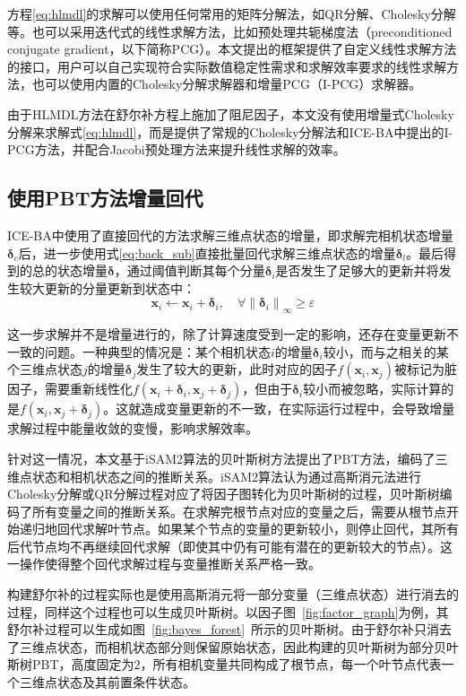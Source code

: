 方程\eqref{eq:hlmdl}的求解可以使用任何常用的矩阵分解法，如QR分解、Cholesky分解等。也可以采用迭代式的线性求解方法，比如预处理共轭梯度法（preconditioned conjugate gradient，以下简称PCG）。本文提出的框架提供了自定义线性求解方法的接口，用户可以自己实现符合实际数值稳定性需求和求解效率要求的线性求解方法，也可以使用内置的Cholesky分解求解器和增量PCG（I-PCG）求解器。

由于HLMDL方法在舒尔补方程上施加了阻尼因子，本文没有使用增量式Cholesky分解\citep{polok2013incremental}来求解式\eqref{eq:hlmdl}，而是提供了常规的Cholesky分解法和ICE-BA中提出的I-PCG方法，并配合Jacobi预处理方法\citep{jeong2012pushing}来提升线性求解的效率。

\subsection{使用PBT方法增量回代}

ICE-BA中使用了直接回代的方法求解三维点状态的增量，即求解完相机状态增量$\bm{\delta}_c$后，进一步使用式\eqref{eq:back_sub}直接批量回代求解三维点状态的增量$\bm{\delta}_l$。最后得到的总的状态增量$\bm{\delta}$，通过阈值判断其每个分量$\bm{\delta}_i$是否发生了足够大的更新并将发生较大更新的分量更新到状态中：
\begin{equation}
    \bm{x}_i \leftarrow \bm{x}_i + \bm{\delta}_i, \quad
    \forall \left\|\bm{\delta}_i\right\|_{\infty} \geq \varepsilon
\end{equation}

这一步求解并不是增量进行的，除了计算速度受到一定的影响，还存在变量更新不一致的问题。一种典型的情况是：某个相机状态$i$的增量$\bm{\delta}_i$较小，而与之相关的某个三维点状态$j$的增量$\bm{\delta}_{j}$发生了较大的更新，此时对应的因子$f(\bm{x}_i,\bm{x}_j)$被标记为脏因子，需要重新线性化$f(\bm{x}_i+\bm{\delta}_i,\bm{x}_j+\bm{\delta}_j)$，但由于$\bm{\delta}_i$较小而被忽略，实际计算的是$f(\bm{x}_i,\bm{x}_j+\bm{\delta}_j)$。这就造成变量更新的不一致，在实际运行过程中，会导致增量求解过程中能量收敛的变慢，影响求解效率。

针对这一情况，本文基于iSAM2算法的贝叶斯树方法提出了PBT方法，编码了三维点状态和相机状态之间的推断关系。iSAM2算法认为通过高斯消元法进行Cholesky分解或QR分解过程对应了将因子图转化为贝叶斯树的过程，贝叶斯树编码了所有变量之间的推断关系。在求解完根节点对应的变量之后，需要从根节点开始递归地回代求解叶节点。如果某个节点的变量的更新较小，则停止回代，其所有后代节点均不再继续回代求解（即使其中仍有可能有潜在的更新较大的节点）。这一操作使得整个回代求解过程与变量推断关系严格一致。

构建舒尔补的过程实际也是使用高斯消元将一部分变量（三维点状态）进行消去的过程，同样这个过程也可以生成贝叶斯树。以因子图~\ref{fig:factor_graph}为例，其舒尔补过程可以生成如图~\ref{fig:bayes_forest}~所示的贝叶斯树。由于舒尔补只消去了三维点状态，而相机状态部分则保留原始状态，因此构建的贝叶斯树为部分贝叶斯树PBT，高度固定为$2$，所有相机变量共同构成了根节点，每一个叶节点代表一个三维点状态及其前置条件状态。

